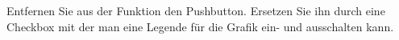 \begin{aufg}[0]
Entfernen Sie aus der Funktion  den
  Pushbutton. Ersetzen Sie ihn durch eine Checkbox mit der man eine Legende
  f\"ur die Grafik ein- und ausschalten kann. 
\end{aufg}